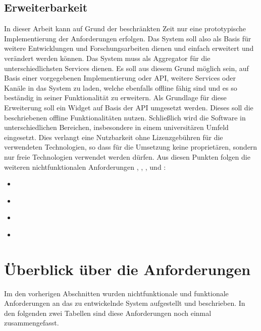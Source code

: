 \subsection{Erweiterbarkeit}
In dieser Arbeit kann auf Grund der beschränkten Zeit nur eine prototypische Implementierung der Anforderungen erfolgen. Das System soll also als Basis für weitere Entwicklungen und Forschungsarbeiten dienen und einfach erweitert und verändert werden können. Das System muss als Aggregator für die unterschiedlichsten Services dienen. Es soll aus diesem Grund möglich sein, auf Basis einer vorgegebenen Implementierung oder API, weitere Services oder Kanäle in das System zu laden, welche ebenfalls offline fähig sind und es so beständig in seiner Funktionalität zu erweitern. Als Grundlage für diese Erweiterung soll ein Widget auf Basis der API umgesetzt werden. Dieses soll die beschriebenen offline Funktionalitäten nutzen. Schließlich wird die Software in unterschiedlichen Bereichen, insbesondere in einem universitären Umfeld eingesetzt. Dies verlangt eine Nutzbarkeit ohne Lizenzgebühren für die verwendeten Technologien, so dass für die Umsetzung keine proprietären, sondern nur freie Technologien verwendet werden dürfen. Aus diesen Punkten folgen die weiteren nichtfunktionalen Anforderungen , , , und :
\begin{itemize}
 \item \requirementnf{\requirementNewWidgetsWithApi}\label{requirementNewWidgetsWithApi}
 \item \requirementnf{\requirementExampleWidget}\label{requirementExampleWidget}
 \item \requirementnf{\requirementExtensibility}\label{requirementExtensibility}
 \item \requirementnf{\requirementOpenSource}\label{requirementOpenSource}
\end{itemize}

\section{Überblick über die Anforderungen}
Im den vorherigen Abschnitten wurden nichtfunktionale und funktionale Anforderungen an das zu entwickelnde System aufgestellt und beschrieben. In den folgenden zwei Tabellen sind diese Anforderungen noch einmal zusammengefasst.

\renewcommand{\arraystretch}{1.4} 


